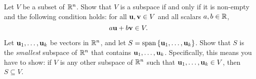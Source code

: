 \begin{ex}
  Let $V$ be a subset of $\mathbb{R}^n$. Show that $V$ is a subspace if and
  only if it is non-empty and the following condition holds: for all
  $\mbox{\bf u},\mbox{\bf v}\in V$ and all scalars $a,b\in\mathbb{R}$,
  \begin{equation*}
    a\mbox{\bf u} + b\mbox{\bf v} \in V.
  \end{equation*}
\end{ex}

\begin{ex}
  Let $\mbox{\bf u}_1,\ldots,\mbox{\bf u}_k$ be vectors in $\mathbb{R}^n$, and let
  $S=\sspan\set{\vect{u}_1,\ldots,\vect{u}_k}$. Show that $S$ is the
  {\em smallest} subspace of $\mathbb{R}^n$ that contains
  $\mbox{\bf u}_1,\ldots,\mbox{\bf u}_k$.  Specifically, this means you have
  to show: if $V$ is any other subspace of $\mathbb{R}^n$ such that
  $\mbox{\bf u}_1,\ldots,\mbox{\bf u}_k\in V$, then $S\subseteq V$.
\end{ex}

